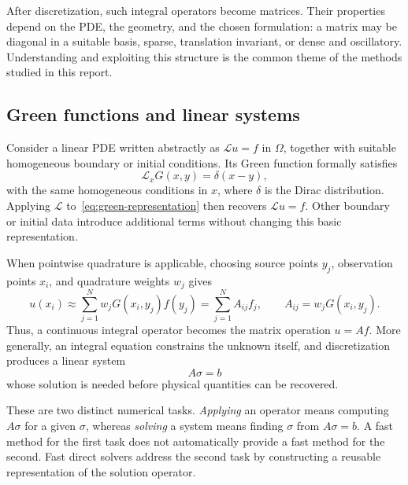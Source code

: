 \documentclass[11pt,a4paper]{article}
\numberwithin{equation}{section}
\begin{document}
After discretization, such integral operators become matrices. Their properties depend on the PDE, the geometry, and the chosen formulation: a matrix may be diagonal in a suitable basis, sparse, translation invariant, or dense and oscillatory. Understanding and exploiting this structure is the common theme of the methods studied in this report.

\subsection{Green functions and linear systems}

Consider a linear PDE written abstractly as $\mathcal{L}u=f$ in $\Omega$, together with suitable homogeneous boundary or initial conditions. Its Green function formally satisfies
\begin{equation}
    \mathcal{L}_xG(x,y)=\delta(x-y),
\end{equation}
with the same homogeneous conditions in $x$, where $\delta$ is the Dirac distribution. Applying $\mathcal{L}$ to~\eqref{eq:green-representation} then recovers $\mathcal{L}u=f$. Other boundary or initial data introduce additional terms without changing this basic representation.

When pointwise quadrature is applicable, choosing source points $y_j$, observation points $x_i$, and quadrature weights $w_j$ gives
\begin{equation}
    u(x_i)\approx\sum_{j=1}^{N}w_jG(x_i,y_j)f(y_j)
    =\sum_{j=1}^{N}A_{ij}f_j,
    \qquad A_{ij}=w_jG(x_i,y_j).
    \label{eq:discrete-green}
\end{equation}
Thus, a continuous integral operator becomes the matrix operation $u=Af$. More generally, an integral equation constrains the unknown itself, and discretization produces a linear system
\begin{equation}
    A\sigma=b
    \label{eq:generic-system}
\end{equation}
whose solution is needed before physical quantities can be recovered.

These are two distinct numerical tasks. \emph{Applying} an operator means computing $A\sigma$ for a given $\sigma$, whereas \emph{solving} a system means finding $\sigma$ from $A\sigma=b$. A fast method for the first task does not automatically provide a fast method for the second. Fast direct solvers address the second task by constructing a reusable representation of the solution operator.
\end{document}
